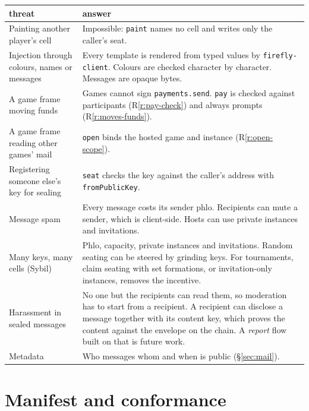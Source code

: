 \documentclass[11pt,a4paper]{article}
\newcommand{\code}[1]{\texttt{#1}}
\begin{document}
\begin{center}\small
\begin{tabularx}{\linewidth}{@{}>{\raggedright\arraybackslash}p{38mm} X@{}}
\toprule
threat & answer\\
\midrule
Painting another player's cell & Impossible: \code{paint} names no cell and writes only the caller's seat.\\
Injection through colours, names or messages & Every template is rendered from typed values by \code{firefly-client}. Colours are checked character by character. Messages are opaque bytes.\\
A game frame moving funds & Games cannot sign \code{payments.send}. \code{pay} is checked against participants (R\ref{r:pay-check}) and always prompts (R\ref{r:moves-funds}).\\
A game frame reading other games' mail & \code{open} binds the hosted game and instance (R\ref{r:open-scope}).\\
Registering someone else's key for sealing & \code{seat} checks the key against the caller's address with \code{fromPublicKey}.\\
Message spam & Every message costs its sender phlo. Recipients can mute a sender, which is client-side. Hosts can use private instances and invitations.\\
Many keys, many cells (Sybil) & Phlo, capacity, private instances and invitations. Random seating can be steered by grinding keys. For tournaments, claim seating with set formations, or invitation-only instances, removes the incentive.\\
Harassment in sealed messages & No one but the recipients can read them, so moderation has to start from a recipient. A recipient can disclose a message together with its content key, which proves the content against the envelope on the chain. A \emph{report} flow built on that is future work.\\
Metadata & Who messages whom and when is public (\S\ref{sec:mail}).\\
\bottomrule
\end{tabularx}
\end{center}

\section{Manifest and conformance}\label{sec:manifest}
\end{document}
